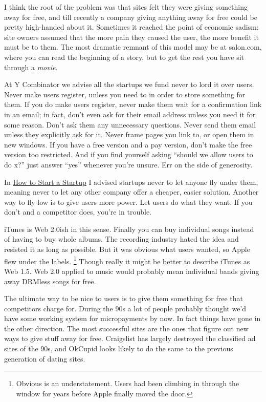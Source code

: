 \documentclass[12pt]{book}
\begin{document}
I think the root of the problem was that sites felt they were giving
something away for free, and till recently a company giving anything
away for free could be pretty high-handed about it. Sometimes it reached
the point of economic sadism: site owners assumed that the more pain
they caused the user, the more benefit it must be to them. The most
dramatic remnant of this model may be at salon.com, where you can read
the beginning of a story, but to get the rest you have sit through a
\emph{movie}.

At Y Combinator we advise all the startups we fund never to lord it over
users. Never make users register, unless you need to in order to store
something for them. If you do make users register, never make them wait
for a confirmation link in an email; in fact, don't even ask for their
email address unless you need it for some reason. Don't ask them any
unnecessary questions. Never send them email unless they explicitly ask
for it. Never frame pages you link to, or open them in new windows. If
you have a free version and a pay version, don't make the free version
too restricted. And if you find yourself asking ``should we allow users
to do x?'' just answer ``yes'' whenever you're unsure. Err on the side
of generosity.

In \href{start.html}{How to Start a Startup} I advised startups never to
let anyone fly under them, meaning never to let any other company offer
a cheaper, easier solution. Another way to fly low is to give users more
power. Let users do what they want. If you don't and a competitor does,
you're in trouble.

iTunes is Web 2.0ish in this sense. Finally you can buy individual songs
instead of having to buy whole albums. The recording industry hated the
idea and resisted it as long as possible. But it was obvious what users
wanted, so Apple flew under the labels. \footnote{Obvious is an understatement. Users had been climbing in through
the window for years before Apple finally moved the door.} Though
really it might be better to describe iTunes as Web 1.5. Web 2.0 applied
to music would probably mean individual bands giving away DRMless songs
for free.

The ultimate way to be nice to users is to give them something for free
that competitors charge for. During the 90s a lot of people probably
thought we'd have some working system for micropayments by now. In fact
things have gone in the other direction. The most successful sites are
the ones that figure out new ways to give stuff away for free.
Craigslist has largely destroyed the classified ad sites of the 90s, and
OkCupid looks likely to do the same to the previous generation of dating
sites.
\end{document}
